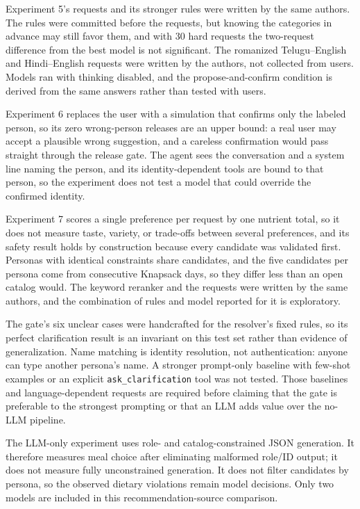 \documentclass[
  10pt,
  letterpaper,
]{article}
\begin{document}
Experiment 5's requests and its stronger rules were written by the same
authors. The rules were committed before the requests, but knowing the
categories in advance may still favor them, and with 30 hard requests
the two-request difference from the best model is not significant. The
romanized Telugu--English and Hindi--English requests were written by
the authors, not collected from users. Models ran with thinking
disabled, and the propose-and-confirm condition is derived from the same
answers rather than tested with users.

Experiment 6 replaces the user with a simulation that confirms only the
labeled person, so its zero wrong-person releases are an upper bound: a
real user may accept a plausible wrong suggestion, and a careless
confirmation would pass straight through the release gate. The agent
sees the conversation and a system line naming the person, and its
identity-dependent tools are bound to that person, so the experiment
does not test a model that could override the confirmed identity.

Experiment 7 scores a single preference per request by one nutrient
total, so it does not measure taste, variety, or trade-offs between
several preferences, and its safety result holds by construction because
every candidate was validated first. Personas with identical constraints
share candidates, and the five candidates per persona come from
consecutive Knapsack days, so they differ less than an open catalog
would. The keyword reranker and the requests were written by the same
authors, and the combination of rules and model reported for it is
exploratory.

The gate's six unclear cases were handcrafted for the resolver's fixed
rules, so its perfect clarification result is an invariant on this test
set rather than evidence of generalization. Name matching is identity
resolution, not authentication: anyone can type another persona's name.
A stronger prompt-only baseline with few-shot examples or an explicit
\texttt{ask\_clarification} tool was not tested. Those baselines and
language-dependent requests are required before claiming that the gate
is preferable to the strongest prompting or that an LLM adds value over
the no-LLM pipeline.

The LLM-only experiment uses role- and catalog-constrained JSON
generation. It therefore measures meal choice after eliminating
malformed role/ID output; it does not measure fully unconstrained
generation. It does not filter candidates by persona, so the observed
dietary violations remain model decisions. Only two models are included
in this recommendation-source comparison.
\end{document}
